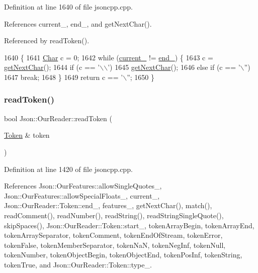 Definition at line 1640 of file jsoncpp.\+cpp.



References current\+\_\+, end\+\_\+, and get\+Next\+Char().



Referenced by read\+Token().


\begin{DoxyCode}
1640                                       \{
1641   \hyperlink{class_json_1_1_our_reader_a0cd0bab4caa66594ab843ccd5f9dc239}{Char} c = 0;
1642   \textcolor{keywordflow}{while} (\hyperlink{class_json_1_1_our_reader_a5211fbbba94be80a22dd2317c621efcc}{current\_} != \hyperlink{class_json_1_1_our_reader_ab1f69b0260c27a0d2d65dc56e42c8f9d}{end\_}) \{
1643     c = \hyperlink{class_json_1_1_our_reader_a298285d035fdbc554caae09d9f0a5859}{getNextChar}();
1644     \textcolor{keywordflow}{if} (c == \textcolor{charliteral}{'\(\backslash\)\(\backslash\)'})
1645       \hyperlink{class_json_1_1_our_reader_a298285d035fdbc554caae09d9f0a5859}{getNextChar}();
1646     \textcolor{keywordflow}{else} \textcolor{keywordflow}{if} (c == \textcolor{charliteral}{'\(\backslash\)''})
1647       \textcolor{keywordflow}{break};
1648   \}
1649   \textcolor{keywordflow}{return} c == \textcolor{charliteral}{'\(\backslash\)''};
1650 \}
\end{DoxyCode}
\mbox{\label{class_json_1_1_our_reader_a0d1e66da47fe2e85f5033c59326dfdc3}} 
\subsubsection{\texorpdfstring{read\+Token()}{readToken()}}
{\footnotesize\ttfamily bool Json\+::\+Our\+Reader\+::read\+Token (\begin{DoxyParamCaption}\item[{\hyperlink{class_json_1_1_our_reader_1_1_token}{Token} \&}]{token }\end{DoxyParamCaption})\hspace{0.3cm}{\ttfamily [private]}}



Definition at line 1420 of file jsoncpp.\+cpp.



References Json\+::\+Our\+Features\+::allow\+Single\+Quotes\+\_\+, Json\+::\+Our\+Features\+::allow\+Special\+Floats\+\_\+, current\+\_\+, Json\+::\+Our\+Reader\+::\+Token\+::end\+\_\+, features\+\_\+, get\+Next\+Char(), match(), read\+Comment(), read\+Number(), read\+String(), read\+String\+Single\+Quote(), skip\+Spaces(), Json\+::\+Our\+Reader\+::\+Token\+::start\+\_\+, token\+Array\+Begin, token\+Array\+End, token\+Array\+Separator, token\+Comment, token\+End\+Of\+Stream, token\+Error, token\+False, token\+Member\+Separator, token\+NaN, token\+Neg\+Inf, token\+Null, token\+Number, token\+Object\+Begin, token\+Object\+End, token\+Pos\+Inf, token\+String, token\+True, and Json\+::\+Our\+Reader\+::\+Token\+::type\+\_\+.



